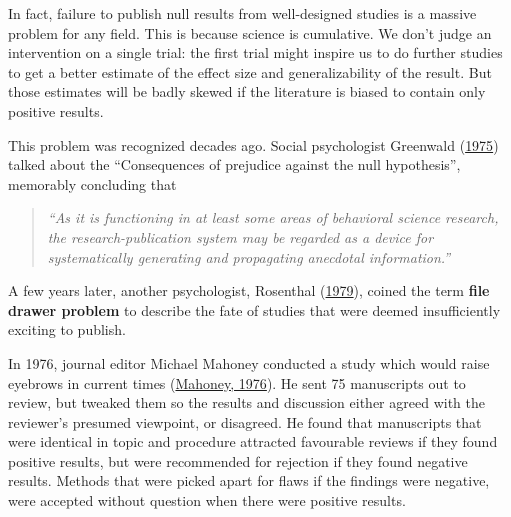 \documentclass{krantz}
\begin{document}
In fact, failure to publish null results from well-designed studies is a massive problem for any field. This is because science is cumulative. We don't judge an intervention on a single trial: the first trial might inspire us to do further studies to get a better estimate of the effect size and generalizability of the result. But those estimates will be badly skewed if the literature is biased to contain only positive results.

This problem was recognized decades ago. Social psychologist Greenwald (\protect\hyperlink{ref-greenwald1975}{1975}) talked about the ``Consequences of prejudice against the null hypothesis'', memorably concluding that

\begin{quote}
\emph{``As it is functioning in at least some areas of behavioral science research, the research-publication system may be regarded as a device for systematically generating and propagating anecdotal information.''}
\end{quote}

A few years later, another psychologist, Rosenthal (\protect\hyperlink{ref-rosenthal1979}{1979}), coined the term \textbf{file drawer problem} to describe the fate of studies that were deemed insufficiently exciting to publish.

In 1976, journal editor Michael Mahoney conducted a study which would raise eyebrows in current times (\protect\hyperlink{ref-mahoney1976}{Mahoney, 1976}). He sent 75 manuscripts out to review, but tweaked them so the results and discussion either agreed with the reviewer's presumed viewpoint, or disagreed. He found that manuscripts that were identical in topic and procedure attracted favourable reviews if they found positive results, but were recommended for rejection if they found negative results. Methods that were picked apart for flaws if the findings were negative, were accepted without question when there were positive results.
\end{document}
